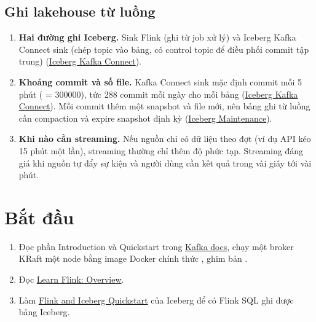 \subsection{Ghi lakehouse từ luồng}
\begin{enumerate}[resume]
  \item \textbf{Hai đường ghi Iceberg.} Sink Flink (ghi từ job xử lý) và Iceberg Kafka Connect sink (chép topic vào bảng, có control topic để điều phối commit tập trung) (\href{https://iceberg.apache.org/docs/latest/kafka-connect/}{Iceberg Kafka Connect}).
  \item \textbf{Khoảng commit và số file.} Kafka Connect sink mặc định commit mỗi 5 phút ( = 300000), tức 288 commit mỗi ngày cho mỗi bảng (\href{https://iceberg.apache.org/docs/latest/kafka-connect/}{Iceberg Kafka Connect}). Mỗi commit thêm một snapshot và file mới, nên bảng ghi từ luồng cần compaction và expire snapshot định kỳ (\href{https://iceberg.apache.org/docs/latest/maintenance/}{Iceberg Maintenance}).
  \item \textbf{Khi nào cần streaming.} Nếu nguồn chỉ có dữ liệu theo đợt (ví dụ API kéo 15 phút một lần), streaming thường chỉ thêm độ phức tạp. Streaming đáng giá khi nguồn tự đẩy sự kiện và người dùng cần kết quả trong vài giây tới vài phút.
\end{enumerate}

\section{Bắt đầu}
\begin{enumerate}
  \item Đọc phần Introduction và Quickstart trong \href{https://kafka.apache.org/documentation/}{Kafka docs}, chạy một broker KRaft một node bằng image Docker chính thức , ghim bản .
  \item Đọc \href{https://nightlies.apache.org/flink/flink-docs-stable/docs/learn-flink/overview/}{Learn Flink: Overview}.
  \item Làm \href{https://iceberg.apache.org/flink-quickstart/}{Flink and Iceberg Quickstart} của Iceberg để có Flink SQL ghi được bảng Iceberg.
\end{enumerate}

